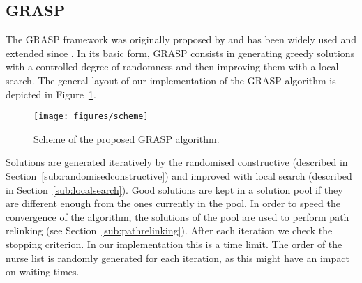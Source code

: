 \documentclass[a4paper,11pt,authoryear]{elsarticle}
\begin{document}
\subsection{GRASP}
\label{sub:grasp}
\noindent The GRASP framework was originally proposed by \cite{feo1989} and has been widely used and extended since \citep{resende2016}. In its basic form, GRASP consists in generating greedy solutions with a controlled degree of randomness and then improving them with a local search. The general layout of our implementation of the GRASP algorithm is depicted in Figure~\ref{fig:graspdiagram}.

\begin{figure}[htb!]
    \centering
    \texttt{[image: figures/scheme]}
    \caption{Scheme of the proposed GRASP algorithm.}
    \label{fig:graspdiagram}
\end{figure}

\noindent Solutions are generated iteratively by the randomised constructive (described in Section~\ref{sub:randomisedconstructive}) and improved with local search (described in Section~\ref{sub:localsearch}). Good solutions are kept in a solution pool if they are different enough from the ones currently in the pool. In order to speed the convergence of the algorithm, the solutions of the pool are used to perform path relinking (see Section~\ref{sub:pathrelinking}). After each iteration we check the stopping criterion. In our implementation this is a time limit. The order of the nurse list is randomly generated for each iteration, as this might have an impact on waiting times. 

\end{document}
